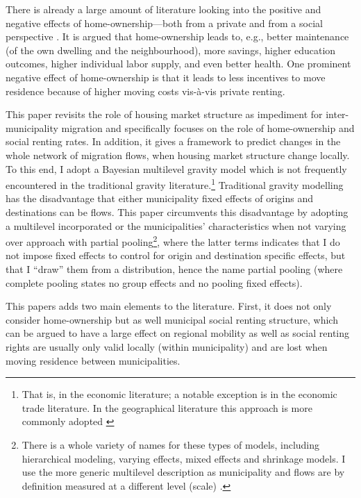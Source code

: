 \documentclass[fleqn,10pt]{SelfArx} %
\begin{document}
There is already a large amount of literature looking into the positive and
negative effects of home-ownership---both from a private and from a social
perspective \citep[see for an overview][]{dietz2003social}. It is argued that
home-ownership leads to, e.g., better maintenance (of the own dwelling and the
neighbourhood), more savings, higher education outcomes, higher individual labor
supply, and even better health. One prominent negative effect of home-ownership
is that it leads to less incentives to move residence because of higher moving
costs vis-\`{a}-vis private renting.

This paper revisits the role of housing market structure as impediment for
inter-municipality migration and specifically focuses on the role of
home-ownership and social renting rates. In addition, it gives a framework to
predict changes in the whole network of migration flows, when housing market
structure change locally. To this end, I adopt a Bayesian multilevel gravity
model which is not frequently encountered in the traditional gravity
literature.\footnote{That is, in the economic literature; a notable exception is
  \citet{ranjan2007bayesian} in the economic trade literature. In the
  geographical literature this approach is more commonly adopted \citep[see
  within a migration context][]{congdon2010random, congdon2012spatial}}
Traditional gravity modelling has the disadvantage that either municipality
fixed effects of origins and destinations can be flows. This paper circumvents
this disadvantage by adopting a multilevel incorporated or the municipalities'
characteristics when not varying over approach with partial
pooling\footnote{There is a whole variety of names for these types of models,
  including hierarchical modeling, varying effects, mixed effects and shrinkage
  models. I use the more generic multilevel description as municipality and
  flows are by definition measured at a different level (scale) \citep[see][for
  an indepth discussion]{gelman2013bayesian}.}, where the latter terms indicates
that I do not impose fixed effects to control for origin and destination
specific effects, but that I ``draw'' them from a distribution, hence the name
partial pooling (where complete pooling states no group effects and no pooling
fixed effects).

This papers adds two main elements to the literature. First, it does not only
consider home-ownership but as well municipal social renting structure, which
can be argued \citep[see, e.g.,][]{hughes1981council,
  boyle1997public,boyle1998migration} to have a large effect on regional
mobility as well as social renting rights are usually only valid locally (within
municipality) and are lost when moving residence between municipalities.
\end{document}
